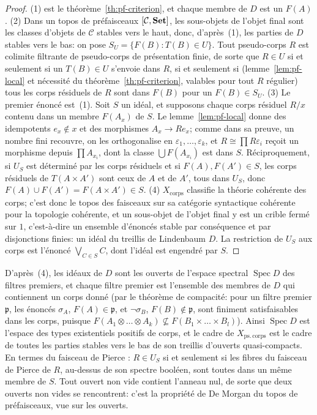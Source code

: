 \begin{proof}
(1) est le théorème~\ref{th:pf-criterion}, et chaque membre de $D$ est un $F(A)$. (2) Dans un topos de préfaisceaux $[\mathcal C,\mathbf{Set}]$, les sous-objets de l'objet final sont les classes d'objets de $\mathcal C$ stables vers le haut, donc, d'après~(1), les parties de $D$ stables vers le bas: on pose $S_U = \{F(B) : T(B)\in U\}$. Tout pseudo-corps $R$ est colimite filtrante de pseudo-corps de présentation finie, de sorte que $R\in U$ si et seulement si un $T(B)\in U$ s'envoie dans $R$, si et seulement si (lemme~\ref{lem:pf-local} et nécessité du théorème~\ref{th:pf-criterion}, valables pour tout $R$ régulier) tous les corps résiduels de $R$ sont dans $F(B)$ pour un $F(B)\in S_U$. (3) Le premier énoncé est~(1). Soit $S$ un idéal, et supposons chaque corps résiduel $R/x$ contenu dans un membre $F(A_x)$ de $S$. Le lemme~\ref{lem:pf-local} donne des idempotents $e_x\notin x$ et des morphismes $A_x\to Re_x$; comme dans sa preuve, un nombre fini recouvre, on les orthogonalise en $\varepsilon_1,\dots,\varepsilon_k$, et $R\cong\prod R\varepsilon_i$ reçoit un morphisme depuis $\prod A_{x_i}$, dont la classe $\bigcup F(A_{x_i})$ est dans $S$. Réciproquement, si $U_S$ est déterminé par les corps résiduels et si $F(A), F(A')\in S$, les corps résiduels de $T(A\times A')$ sont ceux de $A$ et de $A'$, tous dans $U_S$, donc $F(A)\cup F(A') = F(A\times A')\in S$. (4) $X_{\mathrm{corps}}$ classifie la théorie cohérente des corps; c'est donc le topos des faisceaux sur sa catégorie syntactique cohérente pour la topologie cohérente, et un sous-objet de l'objet final y est un crible fermé sur $1$, c'est-à-dire un ensemble d'énoncés stable par conséquence et par disjonctions finies: un idéal du treillis de Lindenbaum $D$. La restriction de $U_S$ aux corps est l'énoncé $\bigvee_{C\in S}C$, dont l'idéal est engendré par $S$.
\end{proof}

D'après~(4), les idéaux de $D$ sont les ouverts de l'espace spectral $\operatorname{Spec}D$ des filtres premiers, et chaque filtre premier est l'ensemble des membres de $D$ qui contiennent un corps donné (par le théorème de compacité: pour un filtre premier $\mathfrak p$, les énoncés $\sigma_A$, $F(A)\in\mathfrak p$, et $\neg\sigma_B$, $F(B)\notin\mathfrak p$, sont finiment satisfaisables dans les corps, puisque $F(A_1\otimes\dots\otimes A_k)\not\subseteq F(B_1\times\dots\times B_l)$). Ainsi $\operatorname{Spec}D$ est l'espace des types existentiels positifs de corps, et le cadre de $X_{\mathrm{ps.\,corps}}$ est le cadre de toutes les parties stables vers le bas de son treillis d'ouverts quasi-compacts. En termes du faisceau de Pierce \cite{pierce}: $R\in U_S$ si et seulement si les fibres du faisceau de Pierce de $R$, au-dessus de son spectre booléen, sont toutes dans un même membre de $S$. Tout ouvert non vide contient l'anneau nul, de sorte que deux ouverts non vides se rencontrent: c'est la propriété de De Morgan du topos de préfaisceaux, vue sur les ouverts.

